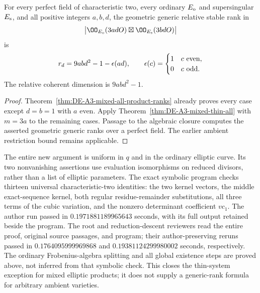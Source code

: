 \begin{corollary}
\label{cor:DE-A3-mixed-product-no-exception}
For every perfect field of characteristic two, every ordinary
$E_{\rm o}$ and supersingular $E_{\rm s}$, and all positive
integers $a,b,d$, the geometric generic relative stable rank in
\[
 \bigl|\OO_{E_{\rm o}}(3adO)\boxtimes
             \OO_{E_{\rm s}}(3bdO)\bigr|
\]
is
\[
            r_d=9abd^2-1-\epsilon(ad),\qquad
 \epsilon(c)=\begin{cases}1&c\ {\rm even},\\0&c\ {\rm odd}.
                         \end{cases}
\]
The relative coherent dimension is $9abd^2-1$.
\end{corollary}
\begin{proof}
Theorem~\ref{thm:DE-A3-mixed-all-product-ranks} already proves
every case except $d=b=1$ with $a$ even.
Apply Theorem~\ref{thm:DE-A3-mixed-thin-all} with $m=3a$
to the remaining cases.  Passage to the algebraic closure
computes the asserted geometric generic ranks over a perfect field.
The earlier ambient restriction bound remains applicable.
\end{proof}

\begin{remark}
\label{rem:DE-A3-mixed-thin-residue-checks}
The entire new argument is uniform in $q$ and in the ordinary elliptic
curve.  Its two nonvanishing assertions use evaluation isomorphisms
on reduced divisors, rather than a list of elliptic parameters.
The exact symbolic program
checks thirteen universal characteristic-two identities: the two
kernel vectors, the middle exact-sequence kernel, both regular
residue-remainder substitutions, all three terms of the cubic
variation, and the nonzero determinant coefficient $vc_1$.
The author run passed in $0.1971881189965643$ seconds, with its full
output retained beside the program.
The root and reduction-descent reviewers read the entire proof,
original source passages, and program; their author-preserving
reruns passed in $0.1764095999969868$ and
$0.19381124299980002$ seconds, respectively.
The ordinary Frobenius-algebra splitting and all global existence
steps are proved above, not inferred from that symbolic check.
This closes the thin-system exception for mixed elliptic products;
it does not supply a generic-rank formula for arbitrary ambient
varieties.
\end{remark}
